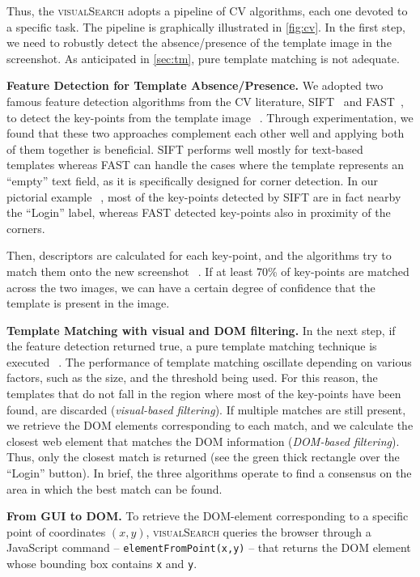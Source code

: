 Thus, the \textsc{visualSearch} adopts a pipeline of CV algorithms, each one devoted to a specific task. The pipeline is graphically illustrated in \autoref{fig:cv}. In the first step, we need to robustly detect the absence/presence of the template image in the screenshot. As anticipated in \autoref{sec:tm}, pure template matching is not adequate. %

\noindent
\textbf{Feature Detection for Template Absence/Presence.}
We adopted two famous feature detection algorithms from the CV literature, SIFT~\cite{Lowe1999,Lowe2004} and FAST~\cite{rosten2005tracking,rosten2008faster}, to detect the key-points from the template image~\textcircled{}. Through experimentation, we found that these two approaches complement each other well and applying both of them together is beneficial. SIFT performs well mostly for text-based templates whereas FAST can handle the cases where the template represents an ``empty'' text field, as it is specifically designed for corner detection. In our pictorial example~\textcircled{}, most of the key-points detected by SIFT are in fact nearby the ``Login'' label, whereas FAST detected key-points also in proximity of the corners.
 
Then, descriptors are calculated for each key-point, and the algorithms try to match them onto the new screenshot~\textcircled{}.
If at least 70\% of key-points are matched across the two images, we can have a certain degree of confidence that the template is present in the image. 

\noindent
\textbf{Template Matching with visual and DOM filtering.}
In the next step, if the feature detection returned true, a pure template matching technique is executed~\textcircled{}. The performance of template matching oscillate depending on various factors, such as the size, and the threshold being used. For this reason, the templates that do not fall in the region where most of the key-points have been found, are discarded (\textit{visual-based filtering}). If multiple matches are still present, we retrieve the DOM elements corresponding to each match, and we calculate the closest web element that matches the DOM information (\textit{DOM-based filtering}).
Thus, only the closest match is returned (see the green thick rectangle over the ``Login'' button). In brief, the three algorithms operate to find a consensus on the area in which the best match can be found. 

\noindent
\textbf{From GUI to DOM.}
To retrieve the DOM-element corresponding to a specific point of coordinates $(x,y)$, \textsc{visualSearch} queries the browser through a JavaScript command -- \texttt{elementFromPoint(x,y)} -- that returns the DOM element whose bounding box contains \texttt{x} and \texttt{y}. 

